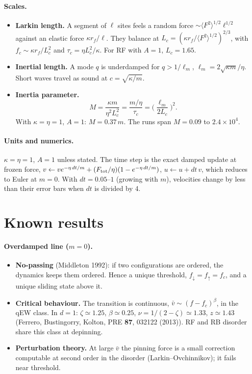\documentclass[10pt,a4paper]{article}
\newcommand{\fd}{f_\downarrow}
\newcommand{\fu}{f_\uparrow}
\newcommand{\fcs}{f_c}
\begin{document}
\paragraph{Scales.}
\begin{itemize}
\item \textbf{Larkin length.} A segment of $\ell$ sites feels a random force $\sim\langle F^2\rangle^{1/2}\ell^{1/2}$ against an elastic force $\kappa r_f/\ell$. They balance at $L_c=(\kappa r_f/\langle F^2\rangle^{1/2})^{2/3}$, with $\fcs\sim\kappa r_f/L_c^2$ and $\tau_c=\eta L_c^2/\kappa$. For RF with $A=1$, $L_c=1.65$.
\item \textbf{Inertial length.} A mode $q$ is underdamped for $q>1/\ell_m$, $\ell_m=2\sqrt{\kappa m}/\eta$. Short waves travel as sound at $c=\sqrt{\kappa/m}$.
\item \textbf{Inertia parameter.}
\begin{equation}
M=\frac{\kappa m}{\eta^2L_c^2}=\frac{m/\eta}{\tau_c}=\Big(\frac{\ell_m}{2L_c}\Big)^2 .
\end{equation}
With $\kappa=\eta=1$, $A=1$: $M=0.37\,m$. The runs span $M=0.09$ to $2.4\times10^4$.
\end{itemize}

\paragraph{Units and numerics.}
$\kappa=\eta=1$, $A=1$ unless stated. The time step is the exact damped update at frozen force, $v\leftarrow ve^{-\eta\,dt/m}+(F_{\rm tot}/\eta)(1-e^{-\eta\,dt/m})$, $u\leftarrow u+dt\,v$, which reduces to Euler at $m=0$. With $dt=0.05$--$1$ (growing with $m$), velocities change by less than their error bars when $dt$ is divided by 4.

\section{Known results}
\label{sec:known}

\paragraph{Overdamped line ($m=0$).}
\begin{itemize}
\item \textbf{No-passing} (Middleton 1992): if two configurations are ordered, the dynamics keeps them ordered. Hence a unique threshold, $\fd=\fu=\fcs$, and a unique sliding state above it.
\item \textbf{Critical behaviour.} The transition is continuous, $\bar v\sim(f-\fcs)^\beta$, in the qEW class. In $d=1$: $\zeta\simeq1.25$, $\beta\simeq0.25$, $\nu=1/(2-\zeta)\simeq1.33$, $z\simeq1.43$ (Ferrero, Bustingorry, Kolton, PRE \textbf{87}, 032122 (2013)). RF and RB disorder share this class at depinning.
\item \textbf{Perturbation theory.} At large $\bar v$ the pinning force is a small correction computable at second order in the disorder (Larkin--Ovchinnikov); it fails near threshold.
\end{itemize}
\end{document}
